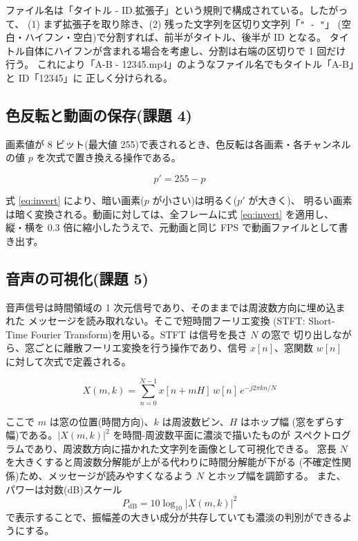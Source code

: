 ファイル名は「タイトル - ID.拡張子」という規則で構成されている。したがって、
(1) まず拡張子を取り除き、(2) 残った文字列を区切り文字列「{\tt "\ -\ "}」
(空白・ハイフン・空白)で分割すれば、前半がタイトル、後半が ID となる。
タイトル自体にハイフンが含まれる場合を考慮し、分割は右端の区切りで 1 回だけ行う。
これにより「A-B - 12345.mp4」のようなファイル名でもタイトル「A-B」と ID「12345」に
正しく分けられる。

\subsection{色反転と動画の保存(課題 4)}

画素値が 8 ビット(最大値 255)で表されるとき、色反転は各画素・各チャンネルの値
$p$ を次式で置き換える操作である。

\begin{equation}\label{eq:invert}
p' = 255 - p
\end{equation}

式 \ref{eq:invert} により、暗い画素($p$ が小さい)は明るく($p'$ が大きく)、
明るい画素は暗く変換される。動画に対しては、全フレームに式 \ref{eq:invert} を適用し、
縦・横を 0.3 倍に縮小したうえで、元動画と同じ FPS で動画ファイルとして書き出す。

\subsection{音声の可視化(課題 5)}

音声信号は時間領域の 1 次元信号であり、そのままでは周波数方向に埋め込まれた
メッセージを読み取れない。そこで短時間フーリエ変換
(STFT: Short-Time Fourier Transform)を用いる。STFT は信号を長さ $N$ の窓で
切り出しながら、窓ごとに離散フーリエ変換を行う操作であり、信号 $x[n]$、窓関数 $w[n]$
に対して次式で定義される。

\begin{equation}\label{eq:stft}
X(m, k) = \sum_{n=0}^{N-1} x[n + mH]\, w[n]\, e^{-j 2 \pi k n / N}
\end{equation}

ここで $m$ は窓の位置(時間方向)、$k$ は周波数ビン、$H$ はホップ幅
(窓をずらす幅)である。$|X(m,k)|^2$ を時間-周波数平面に濃淡で描いたものが
スペクトログラムであり、周波数方向に描かれた文字列を画像として可視化できる。
窓長 $N$ を大きくすると周波数分解能が上がる代わりに時間分解能が下がる
(不確定性関係)ため、メッセージが読みやすくなるよう $N$ とホップ幅を調節する。
また、パワーは対数(dB)スケール
\begin{equation}\label{eq:db}
P_{\mathrm{dB}} = 10 \log_{10} |X(m,k)|^2
\end{equation}
で表示することで、振幅差の大きい成分が共存していても濃淡の判別ができるようにする。

